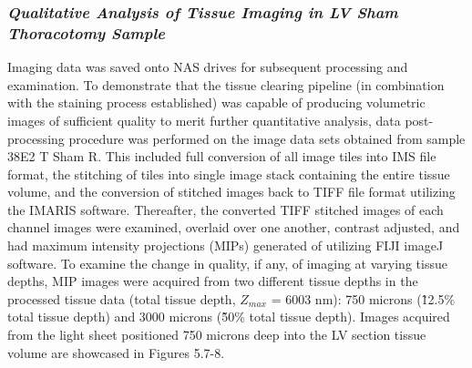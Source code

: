 \subsubsection{\textit{Qualitative Analysis of Tissue Imaging in LV Sham Thoracotomy Sample}}
Imaging data was saved onto NAS drives for subsequent processing and examination. To demonstrate that the tissue clearing pipeline (in combination with the staining process established) was capable of producing volumetric images of sufficient quality to merit further quantitative analysis, data post-processing procedure was performed on the image data sets obtained from sample 38E2 T Sham R. This included full conversion of all image tiles into IMS file format, the stitching of tiles into single image stack containing the entire tissue volume, and the conversion of stitched images back to TIFF file format utilizing the IMARIS software. Thereafter, the converted TIFF stitched images of each channel images were examined, overlaid over one another, contrast adjusted, and had maximum intensity projections (MIPs) generated of utilizing FIJI imageJ software. To examine the change in quality, if any, of imaging at varying tissue depths, MIP images were acquired from two different tissue depths in the processed tissue data (total tissue depth, $Z_{max}$ = 6003 nm): 750 microns (\~12.5\% total tissue depth) and 3000 microns (\~50\% total tissue depth). Images acquired from the light sheet positioned 750 microns deep into the LV section tissue volume are showcased in Figures 5.7-8. 


